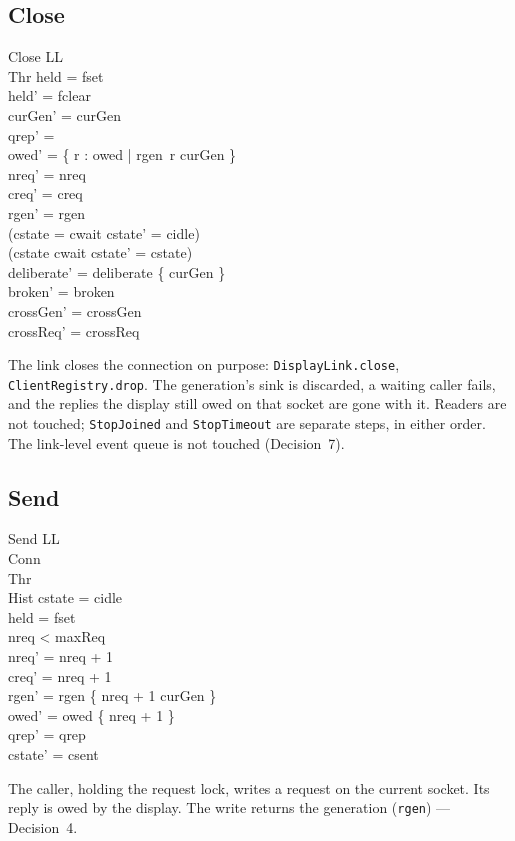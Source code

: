\documentclass[a4paper,10pt,fleqn]{article}
\begin{document}
\subsection{Close}

\begin{schema}{Close}
  \Delta LL \\
  \Xi Thr
\where
  held = fset \\
  held' = fclear \\
  curGen' = curGen \\
  qrep' = \emptyset \\
  owed' = \{ r : owed | rgen~r \neq curGen \} \\
  nreq' = nreq \\
  creq' = creq \\
  rgen' = rgen \\
  (cstate = cwait \implies cstate' = cidle) \\
  (cstate \neq cwait \implies cstate' = cstate) \\
  deliberate' = deliberate \cup \{ curGen \} \\
  broken' = broken \\
  crossGen' = crossGen \\
  crossReq' = crossReq
\end{schema}
The link closes the connection on purpose: \texttt{DisplayLink.close},
\texttt{ClientRegistry.drop}.  The generation's sink is discarded, a waiting
caller fails, and the replies the display still owed on that socket are gone
with it.  Readers are not touched; \texttt{StopJoined} and
\texttt{StopTimeout} are separate steps, in either order.  The link-level
event queue is not touched (Decision~7).

\subsection{Send}

\begin{schema}{Send}
  \Delta LL \\
  \Xi Conn \\
  \Xi Thr \\
  \Xi Hist
\where
  cstate = cidle \\
  held = fset \\
  nreq < maxReq \\
  nreq' = nreq + 1 \\
  creq' = nreq + 1 \\
  rgen' = rgen \oplus \{ nreq + 1 \mapsto curGen \} \\
  owed' = owed \cup \{ nreq + 1 \} \\
  qrep' = qrep \\
  cstate' = csent
\end{schema}
The caller, holding the request lock, writes a request on the current socket.
Its reply is owed by the display.  The write returns the generation
(\texttt{rgen}) --- Decision~4.
\end{document}
